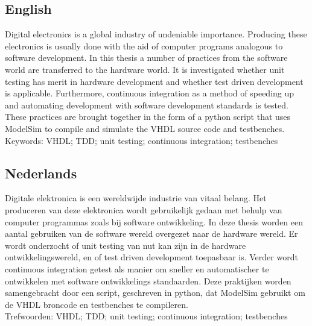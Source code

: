 \documentclass[11pt,british]{article}
\begin{document}
\subsection*{English}
Digital electronics is a global industry of undeniable importance. Producing these electronics is usually done with the aid of computer programs analogous to software development. In this thesis a number of practices from the software world are transferred to the hardware world. It is investigated whether unit testing has merit in hardware development and whether test driven development is applicable. Furthermore, continuous integration as a method of speeding up and automating development with software development standards is tested. These practices are brought together in the form of a python script that uses ModelSim to compile and simulate the VHDL source code and testbenches.
\\[\baselineskip]
Keywords: VHDL; TDD; unit testing; continuous integration; testbenches
\\[2\baselineskip]

\subsection*{Nederlands}
Digitale elektronica is een wereldwijde industrie van vitaal belang. Het produceren van deze elektronica wordt gebruikelijk gedaan met behulp van computer programmas zoals bij software ontwikkeling. In deze thesis worden een aantal gebruiken van de software wereld overgezet naar de hardware wereld. Er wordt onderzocht of unit testing van nut kan zijn in de hardware ontwikkelingswereld, en of test driven development toepasbaar is. Verder wordt continuous integration getest als manier om sneller en automatischer te ontwikkelen met software ontwikkelings standaarden. Deze praktijken worden samengebracht door een script, geschreven in python, dat ModelSim gebruikt om de VHDL broncode en testbenches te compileren.
\\[\baselineskip]
Trefwoorden: VHDL; TDD; unit testing; continuous integration; testbenches

\end{document}
